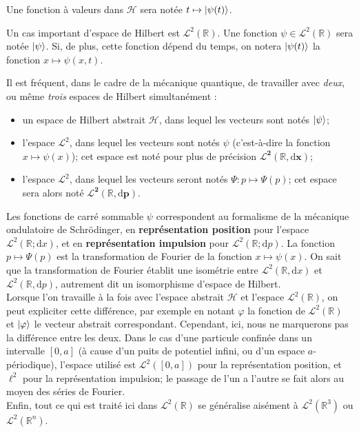 Une fonction à valeurs dans $\mathscr H$ sera notée $t \mapsto \ket{\psi(t)}$.

\smallskip

Un cas important d'espace de Hilbert est $\mathcal L^2(\mathbb R)$. Une fonction $\psi \in \mathcal L^2(\mathbb R)$ sera notée $\ket{\psi}$. Si, de plus, cette fonction dépend du temps, on notera $\ket{\psi(t)}$ la fonction $x \mapsto \psi(x,t)$.

\begin{Rema}
    Il est fréquent, dans le cadre de la mécanique quantique, de travailler avec {\em deux}, ou même {\em trois} espaces de Hilbert simultanément :
    \begin{itemize}[label = $\bullet$]
        \item un espace de Hilbert \guillemotleft{}abstrait\guillemotright{} $\mathscr H$, dans lequel les vecteurs sont notés $\ket{\psi}$;
        \item l'espace $\mathcal L^2$, dans lequel les vecteurs sont notés $\psi$ (c'est-à-dire la fonction $x\mapsto \psi(x)$); cet espace est noté pour plus de précision $\bm{\mathcal L^2(\mathbb{R}, \mathrm{d}x)}
$;
        \item l'espace $\mathcal L^2$, dans lequel les vecteurs seront notés $\Psi \colon p \mapsto \Psi(p)$; cet espace sera alors noté $\bm{\mathcal L^2(\mathbb{R}, \mathrm{d}p)}
$.
    \end{itemize}

    Les fonctions de carré sommable $\psi$ correspondent au formalisme de la mécanique ondulatoire de Schrödinger, en {\bf représentation position} pour l'espace $\mathcal L^2(\mathbb R ; \mathrm{d} x)$, et en {\bf représentation impulsion} pour $\mathcal L^2(\mathbb R ; \mathrm{d} p)$. La fonction $p \mapsto \Psi(p)$ est la transformation de Fourier de la fonction $x \mapsto \psi(x)$. On sait que la transformation de Fourier établit une isométrie entre $\mathcal L^2(\mathbb R , \mathrm d x )$ et $\mathcal L^2(\mathbb R , \mathrm d p )$, autrement dit un isomorphisme d'espace de Hilbert.\\

    Lorsque l'on travaille à la fois avec l'espace abstrait $\mathscr H$ et l'espace $\mathcal L^2(\mathbb R)$, on peut expliciter cette différence, par exemple en notant \guillemotleft{}$\varphi$\guillemotright{} la fonction de $\mathcal L^2 (\mathbb R)$ et $\ket{\varphi} $ le vecteur abstrait correspondant. Cependant, ici, nous ne marquerons pas la différence entre les deux. Dans le cas d'une particule confinée dans un intervalle $[0 , a]$ (à cause d'un puits de potentiel infini, ou d'un espace $a$-périodique), l'espace utilisé est $\mathcal L^2([0,a])$ pour la représentation position, et $\ell^2$ pour la représentation impulsion; le passage de l'un a l'autre se fait alors au moyen des séries de Fourier.\\

    Enfin, tout ce qui est traité ici dans $\mathcal L^2(\mathbb R )$ se généralise aisément à $\mathcal L^2(\mathbb R^3)$ ou $\mathcal L^2(\mathbb R^n)$.\\
\end{Rema}

